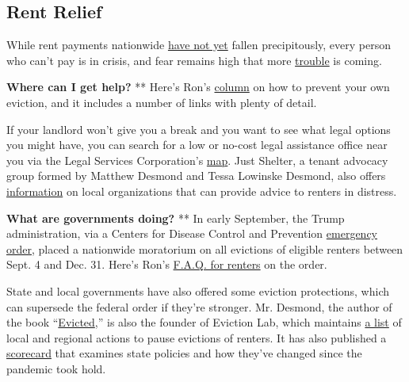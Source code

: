 \hypertarget{rent-relief}{%
\subsection{Rent Relief}\label{rent-relief}}

While rent payments nationwide
\href{https://www.nytimes3xbfgragh.onion/2020/05/31/business/economy/coronavirus-rent-landlords-tenants.html}{have
not yet} fallen precipitously, every person who can't pay is in crisis,
and fear remains high that more
\href{https://www.nytimes3xbfgragh.onion/2020/05/27/us/coronavirus-evictions-renters.html?action=click\&module=RelatedLinks\&pgtype=Article}{trouble}
is coming.

\textbf{Where can I get help?} ** Here's Ron's
\href{https://www.nytimes3xbfgragh.onion/2020/07/11/your-money/coronavirus-eviction-prevention-renters-landlord.html}{column}
on how to prevent your own eviction, and it includes a number of links
with plenty of detail.

If your landlord won't give you a break and you want to see what legal
options you might have, you can search for a low or no-cost legal
assistance office near you via the Legal Services Corporation's
\href{https://www.lsc.gov/what-legal-aid/find-legal-aid}{map}. Just
Shelter, a tenant advocacy group formed by Matthew Desmond and Tessa
Lowinske Desmond, also offers
\href{https://justshelter.org/community-resources/}{information} on
local organizations that can provide advice to renters in distress.

\textbf{What are governments doing?} ** In early September, the Trump
administration, via a Centers for Disease Control and Prevention
\href{https://s3.amazonaws.com/public-inspection.federalregister.gov/2020-19654.pdf}{emergency
order}, placed a nationwide moratorium on all evictions of eligible
renters between Sept. 4 and Dec. 31. Here's Ron's
\href{https://www.nytimes3xbfgragh.onion/2020/09/02/your-money/eviction-moratorium-covid.html}{F.A.Q.
for renters} on the order.

State and local governments have also offered some eviction protections,
which can supersede the federal order if they're stronger. Mr. Desmond,
the author of the book
``\href{https://www.nytimes3xbfgragh.onion/2016/02/28/books/review/matthew-desmonds-evicted-poverty-and-profit-in-the-american-city.html}{Evicted},''
is also the founder of Eviction Lab, which maintains
\href{https://evictionlab.org/covid-eviction-policies/}{a list} of local
and regional actions to pause evictions of renters. It has also
published a
\href{https://evictionlab.org/covid-policy-scorecard/}{scorecard} that
examines state policies and how they've changed since the pandemic took
hold.

